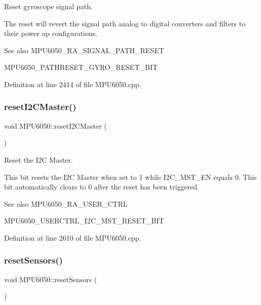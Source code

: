 Reset gyroscope signal path. 

The reset will revert the signal path analog to digital converters and filters to their power up configurations. \begin{DoxySeeAlso}{See also}
M\+P\+U6050\+\_\+\+R\+A\+\_\+\+S\+I\+G\+N\+A\+L\+\_\+\+P\+A\+T\+H\+\_\+\+R\+E\+S\+ET 

M\+P\+U6050\+\_\+\+P\+A\+T\+H\+R\+E\+S\+E\+T\+\_\+\+G\+Y\+R\+O\+\_\+\+R\+E\+S\+E\+T\+\_\+\+B\+IT 
\end{DoxySeeAlso}


Definition at line 2414 of file M\+P\+U6050.\+cpp.

\mbox{\label{classMPU6050_a96332c394f1b7efd44c83a4ff690e732}} 
\subsubsection{\texorpdfstring{resetI2CMaster()}{resetI2CMaster()}}
{\footnotesize\ttfamily void M\+P\+U6050\+::reset\+I2\+C\+Master (\begin{DoxyParamCaption}{ }\end{DoxyParamCaption})}



Reset the I2C Master. 

This bit resets the I2C Master when set to 1 while I2\+C\+\_\+\+M\+S\+T\+\_\+\+EN equals 0. This bit automatically clears to 0 after the reset has been triggered. \begin{DoxySeeAlso}{See also}
M\+P\+U6050\+\_\+\+R\+A\+\_\+\+U\+S\+E\+R\+\_\+\+C\+T\+RL 

M\+P\+U6050\+\_\+\+U\+S\+E\+R\+C\+T\+R\+L\+\_\+\+I2\+C\+\_\+\+M\+S\+T\+\_\+\+R\+E\+S\+E\+T\+\_\+\+B\+IT 
\end{DoxySeeAlso}


Definition at line 2610 of file M\+P\+U6050.\+cpp.

\mbox{\label{classMPU6050_a9a271104d3302abc4af005c69a930094}} 
\subsubsection{\texorpdfstring{resetSensors()}{resetSensors()}}
{\footnotesize\ttfamily void M\+P\+U6050\+::reset\+Sensors (\begin{DoxyParamCaption}{ }\end{DoxyParamCaption})}



